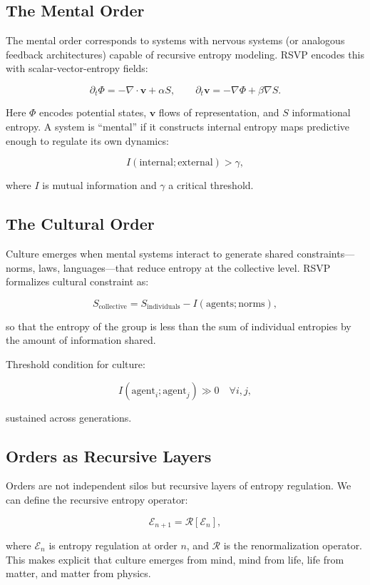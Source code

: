 \documentclass[12pt]{book}
\begin{document}
\subsection{The Mental Order}
The mental order corresponds to systems with nervous systems (or analogous feedback architectures) capable of recursive entropy modeling. RSVP encodes this with scalar-vector-entropy fields:

\[ \partial_t \Phi = - \nabla \cdot \mathbf{v} + \alpha S, \qquad 
\partial_t \mathbf{v} = -\nabla \Phi + \beta \nabla S. \]

Here \( \Phi \) encodes potential states, \( \mathbf{v} \) flows of representation, and \( S \) informational entropy. A system is “mental” if it constructs internal entropy maps predictive enough to regulate its own dynamics:

\[ I(\text{internal}; \text{external}) > \gamma, \]

where \( I \) is mutual information and \( \gamma \) a critical threshold.

\subsection{The Cultural Order}
Culture emerges when mental systems interact to generate shared constraints—norms, laws, languages—that reduce entropy at the collective level. RSVP formalizes cultural constraint as:

\[ S_{\text{collective}} = S_{\text{individuals}} - I(\text{agents}; \text{norms}), \]

so that the entropy of the group is less than the sum of individual entropies by the amount of information shared.

Threshold condition for culture:

\[ I(\text{agent}_i; \text{agent}_j) \gg 0 \quad \forall i,j, \]

sustained across generations.

\subsection{Orders as Recursive Layers}
Orders are not independent silos but recursive layers of entropy regulation. We can define the recursive entropy operator:

\[ \mathcal{E}_{n+1} = \mathcal{R}[\mathcal{E}_n], \]

where \( \mathcal{E}_n \) is entropy regulation at order \( n \), and \( \mathcal{R} \) is the renormalization operator. This makes explicit that culture emerges from mind, mind from life, life from matter, and matter from physics.
\end{document}
